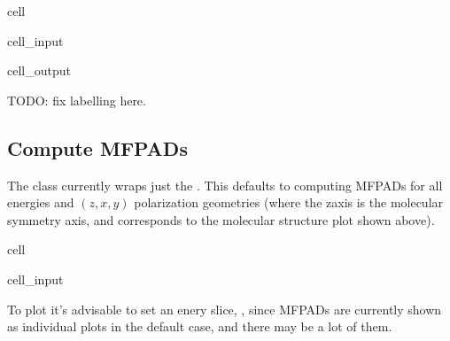 \documentclass[letterpaper,10pt,english]{jupyterBook}
\begin{document}
\begin{sphinxuseclass}{cell}\begin{sphinxVerbatimInput}

\begin{sphinxuseclass}{cell_input}
\begin{sphinxVerbatim}[commandchars=\\\{\}]
  
\end{sphinxVerbatim}

\end{sphinxuseclass}\end{sphinxVerbatimInput}
\begin{sphinxVerbatimOutput}

\begin{sphinxuseclass}{cell_output}
\noindent{}

\noindent{}

\end{sphinxuseclass}\end{sphinxVerbatimOutput}

\end{sphinxuseclass}
\sphinxAtStartPar
TODO: fix labelling here.


\subsection{Compute MFPADs}
\label{\detokenize{testChpt/ePSproc_class_demo_161020:compute-mfpads}}
\sphinxAtStartPar
The class currently wraps just the . This defaults to computing MFPADs for all energies and \((z,x,y)\) polarization geometries (where the z\sphinxhyphen{}axis is the molecular symmetry axis, and corresponds to the molecular structure plot shown above).

\begin{sphinxuseclass}{cell}\begin{sphinxVerbatimInput}

\begin{sphinxuseclass}{cell_input}
\begin{sphinxVerbatim}[commandchars=\\\{\}]
\end{sphinxVerbatim}

\end{sphinxuseclass}\end{sphinxVerbatimInput}

\end{sphinxuseclass}
\sphinxAtStartPar
To plot it’s advisable to set an enery slice, , since MFPADs are currently shown as individual plots in the default case, and there may be a lot of them.
\end{document}
